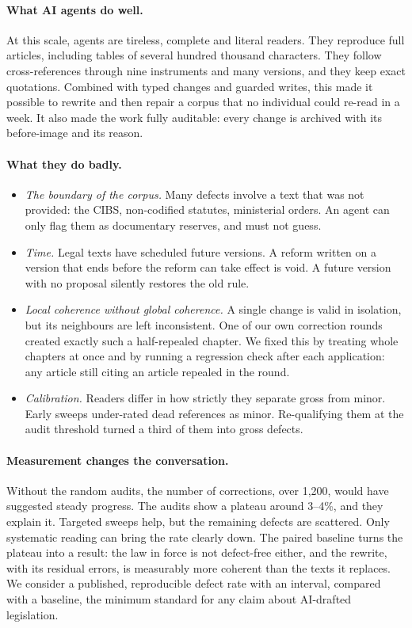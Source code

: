 \documentclass[11pt,a4paper]{article}
\begin{document}
\paragraph{What AI agents do well.}
At this scale, agents are tireless, complete and literal readers. They reproduce full articles, including tables of several hundred thousand characters. They follow cross-references through nine instruments and many versions, and they keep exact quotations. Combined with typed changes and guarded writes, this made it possible to rewrite and then repair a corpus that no individual could re-read in a week. It also made the work fully auditable: every change is archived with its before-image and its reason.

\paragraph{What they do badly.}
\begin{itemize}
  \item \emph{The boundary of the corpus.} Many defects involve a text that was not provided: the CIBS, non-codified statutes, ministerial orders. An agent can only flag them as documentary reserves, and must not guess.
  \item \emph{Time.} Legal texts have scheduled future versions. A reform written on a version that ends before the reform can take effect is void. A future version with no proposal silently restores the old rule.
  \item \emph{Local coherence without global coherence.} A single change is valid in isolation, but its neighbours are left inconsistent. One of our own correction rounds created exactly such a half-repealed chapter. We fixed this by treating whole chapters at once and by running a regression check after each application: any article still citing an article repealed in the round.
  \item \emph{Calibration.} Readers differ in how strictly they separate gross from minor. Early sweeps under-rated dead references as minor. Re-qualifying them at the audit threshold turned a third of them into gross defects.
\end{itemize}

\paragraph{Measurement changes the conversation.}
Without the random audits, the number of corrections, over 1{,}200, would have suggested steady progress. The audits show a plateau around 3--4\%, and they explain it. Targeted sweeps help, but the remaining defects are scattered. Only systematic reading can bring the rate clearly down. The paired baseline turns the plateau into a result: the law in force is not defect-free either, and the rewrite, with its residual errors, is measurably more coherent than the texts it replaces. We consider a published, reproducible defect rate with an interval, compared with a baseline, the minimum standard for any claim about AI-drafted legislation.
\end{document}
